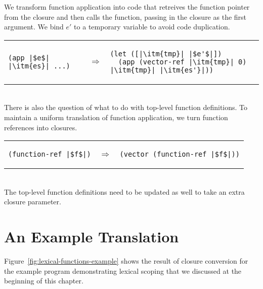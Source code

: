 \documentclass[11pt]{book}
\begin{document}
We transform function application into code that retreives the
function pointer from the closure and then calls the function, passing
in the closure as the first argument. We bind $e'$ to a temporary
variable to avoid code duplication.

\begin{tabular}{lll}
\begin{minipage}{0.3\textwidth}
\begin{lstlisting}
(app |$e$| |\itm{es}| ...)
\end{lstlisting}
\end{minipage}
&
$\Rightarrow$
&
\begin{minipage}{0.5\textwidth}
\begin{lstlisting}
(let ([|\itm{tmp}| |$e'$|])
  (app (vector-ref |\itm{tmp}| 0) |\itm{tmp}| |\itm{es'}|))
\end{lstlisting}
\end{minipage}
\end{tabular}  \\

There is also the question of what to do with top-level function
definitions. To maintain a uniform translation of function
application, we turn function references into closures.

\begin{tabular}{lll}
\begin{minipage}{0.3\textwidth}
\begin{lstlisting}
(function-ref |$f$|)
\end{lstlisting}
\end{minipage}
&
$\Rightarrow$
&
\begin{minipage}{0.5\textwidth}
\begin{lstlisting}
(vector (function-ref |$f$|))
\end{lstlisting}
\end{minipage}
\end{tabular}  \\
%
The top-level function definitions need to be updated as well to take
an extra closure parameter.

\section{An Example Translation}
\label{sec:example-lambda}

Figure~\ref{fig:lexical-functions-example} shows the result of closure
conversion for the example program demonstrating lexical scoping that
we discussed at the beginning of this chapter.
\end{document}
